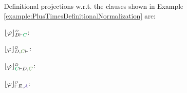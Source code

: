 \begin{example}
\label{example:DProjectionDefinitional}
Definitional projections w.r.t. the clauses shown in Example \ref{example:PlusTimesDefinitionalNormalization} are:

\begin{multicols}{3}{
$\projectionDefinitional{\varphi}{D \seq \hE{C}}$:
\begin{scriptsize}
\begin{prooftree}
 
 
 
\end{prooftree}
\end{scriptsize}
\vfill\columnbreak


$\projectionDefinitional{\varphi}{D, \hF{C} \seq }$:
\begin{scriptsize}
\begin{prooftree}
 
 
 
 
\end{prooftree}
\end{scriptsize}

$\projectionDefinitional{\varphi}{\hE{C} \seq D, \hF{C}}$:
\begin{scriptsize}
\begin{prooftree}
		 
		 
	 
\end{prooftree}
\end{scriptsize}
}
\end{multicols}


\begin{multicols}{3}{
$\projectionDefinitional{\varphi}{\seq E, \hD{A}}$:
\begin{scriptsize}
\begin{prooftree}
 
 
 
 
\end{prooftree}
\end{scriptsize}

}
\end{multicols}
\end{example}
